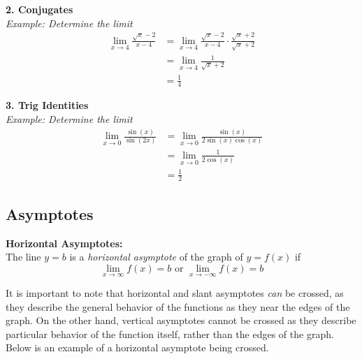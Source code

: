 \documentclass{article}
\begin{document}
            \noindent \color{purple} \textbf{2. Conjugates} \color{blue} \\
            \textit{Example: Determine the limit} \color{black} \\
            \begin{align*}
                \lim_{x\to 4}\frac{\sqrt{x}-2}{x-4}
                &= \lim_{x\to 4}\frac{\sqrt{x}-2}{x-4}\cdot\frac{\sqrt{x}+2}{\sqrt{x}+2} \\
                &= \lim_{x\to 4}\frac{1}{\sqrt{x}+2} \\
                &= \frac{1}{4}
            \end{align*}

            \pagebreak
            \noindent \color{purple} \textbf{3. Trig Identities} \color{blue} \\
            \textit{Example: Determine the limit} \color{black} \\
            \begin{align*}
                \lim_{x\to 0} \frac{\sin{(x)}}{\sin{(2x)}}
                &= \lim_{x\to 0} \frac{\sin{(x)}}{2\sin{(x)}\cos{(x)}} \\
                &= \lim_{x\to 0} \frac{1}{2\cos{(x)}} \\
                &= \frac{1}{2}
            \end{align*}

        \subsection{Asymptotes}
            \color{purple} \textbf{Horizontal Asymptotes:} \color{black} \\
            \noindent The line $y=b$ is a \textit{horizontal asymptote} of the graph of $y=f(x)$ if \\

            \begin{equation*}
                \lim_{x\to\infty}f(x)=b\text{ or }\lim_{x\to-\infty}f(x)=b
            \end{equation*}

            \noindent It is important to note that horizontal and slant asymptotes \textit{can} be crossed,
            as they describe the general behavior of the functions as they near the edges of the graph.
            On the other hand, vertical asymptotes cannot be crossed as they describe particular
            behavior of the function itself, rather than the edges of the graph. Below is an example
            of a horizontal asymptote being crossed. \\
\end{document}
